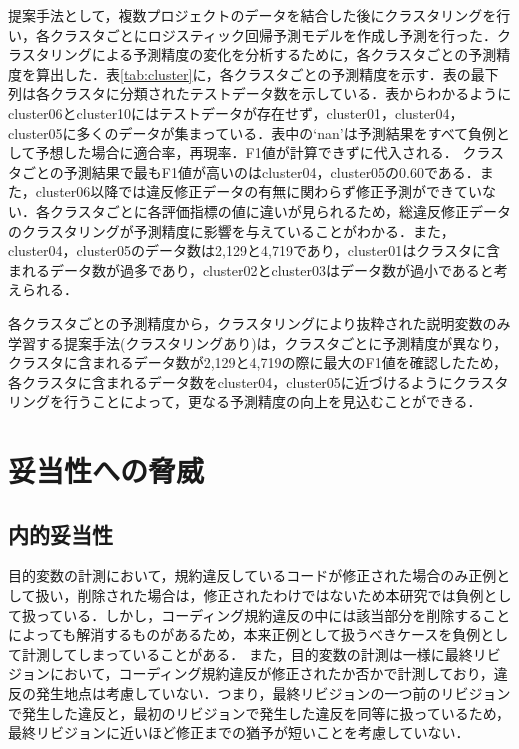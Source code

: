 \documentclass[11pt,dvipdfmx]{jreport}
\begin{document}
提案手法として，複数プロジェクトのデータを結合した後にクラスタリングを行い，各クラスタごとにロジスティック回帰予測モデルを作成し予測を行った．クラスタリングによる予測精度の変化を分析するために，各クラスタごとの予測精度を算出した．表\ref{tab:cluster}に，各クラスタごとの予測精度を示す．表の最下列は各クラスタに分類されたテストデータ数を示している．表からわかるようにcluster06とcluster10にはテストデータが存在せず，cluster01，cluster04，cluster05に多くのデータが集まっている．表中の`nan'は予測結果をすべて負例として予想した場合に適合率，再現率．F1値が計算できずに代入される．
クラスタごとの予測結果で最もF1値が高いのはcluster04，cluster05の0.60である．また，cluster06以降では違反修正データの有無に関わらず修正予測ができていない．各クラスタごとに各評価指標の値に違いが見られるため，総違反修正データのクラスタリングが予測精度に影響を与えていることがわかる．また，cluster04，cluster05のデータ数は2,129と4,719であり，cluster01はクラスタに含まれるデータ数が過多であり，cluster02とcluster03はデータ数が過小であると考えられる．

各クラスタごとの予測精度から，クラスタリングにより抜粋された説明変数のみ学習する提案手法(クラスタリングあり)は，クラスタごとに予測精度が異なり，クラスタに含まれるデータ数が2,129と4,719の際に最大のF1値を確認したため，各クラスタに含まれるデータ数をcluster04，cluster05に近づけるようにクラスタリングを行うことによって，更なる予測精度の向上を見込むことができる．


\chapter{妥当性への脅威}\label{chap:heuristic}
\section{内的妥当性}


目的変数の計測において，規約違反しているコードが修正された場合のみ正例として扱い，削除された場合は，修正されたわけではないため本研究では負例として扱っている．しかし，コーディング規約違反の中には該当部分を削除することによっても解消するものがあるため，本来正例として扱うべきケースを負例として計測してしまっていることがある．
また，目的変数の計測は一様に最終リビジョンにおいて，コーディング規約違反が修正されたか否かで計測しており，違反の発生地点は考慮していない．つまり，最終リビジョンの一つ前のリビジョンで発生した違反と，最初のリビジョンで発生した違反を同等に扱っているため，最終リビジョンに近いほど修正までの猶予が短いことを考慮していない．
\end{document}
